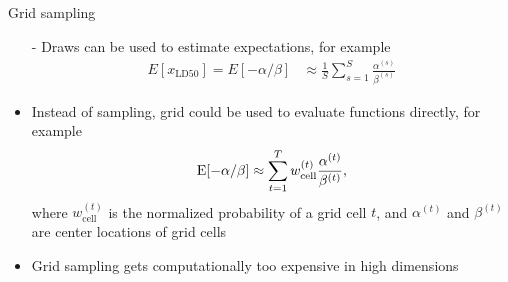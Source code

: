 \documentclass[10pt,handout]{beamer}
\begin{document}
\begin{frame}{Grid sampling}

  \begin{itemize}
  \item[-] Draws can be used to estimate expectations, for example
    \begin{align*}
      E[x_{\mathrm{LD50}}] = E[-\alpha/\beta] & \approx \frac{1}{S}\sum_{s=1}^{S} \frac{\alpha^{(s)}}{\beta^{(s)}}
    \end{align*}
  \item<2->[-] Instead of sampling, grid could be used to evaluate
    functions directly, for example
    \begin{align*}
      \mathrm{E}[-\alpha/\beta] \approx \sum_{t=1}^{T} w_{\mathrm{cell}}^{(t)} \frac{\alpha^{(t)}}{\beta^{(t)}},
    \end{align*}
    where $w_{\mathrm{cell}}^{(t)}$ is the normalized probability of a grid cell $t$, and $\alpha^{(t)}$ and $\beta^{(t)}$ are center locations of grid cells
  \item<3-> Grid sampling gets computationally too expensive in high
    dimensions
  \end{itemize}

\end{frame}
\end{document}
